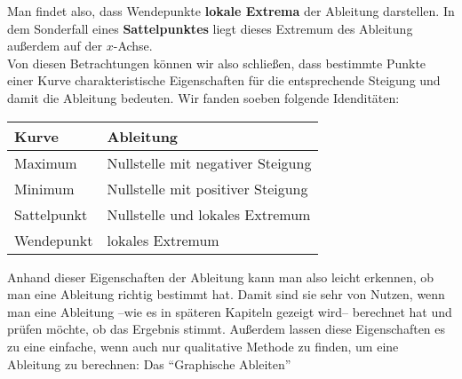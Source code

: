 \documentclass[../../main.tex]{subfiles}
\begin{document}
    Man findet also, dass Wendepunkte \textbf{lokale Extrema} der Ableitung darstellen. In dem Sonderfall eines \textbf{Sattelpunktes} liegt dieses Extremum des Ableitung außerdem auf der $x$-Achse.\\
    Von diesen Betrachtungen können wir also schließen, dass bestimmte Punkte einer Kurve charakteristische Eigenschaften für die entsprechende Steigung und damit die Ableitung bedeuten. Wir fanden soeben folgende Idenditäten:
    
    \begin{center}
        \begin{tabular}{ll}
            Kurve & Ableitung \\\hline
            Maximum & Nullstelle mit negativer Steigung\\
            Minimum & Nullstelle mit positiver Steigung\\
            Sattelpunkt & Nullstelle und lokales Extremum\\
            Wendepunkt & lokales Extremum
        \end{tabular}
    \end{center}
    Anhand dieser Eigenschaften der Ableitung kann man also leicht erkennen, ob man eine Ableitung richtig bestimmt hat. Damit sind sie sehr von Nutzen, wenn man eine Ableitung --wie es in späteren Kapiteln gezeigt wird-- berechnet hat und prüfen möchte, ob das Ergebnis stimmt. Außerdem lassen diese Eigenschaften es zu eine einfache, wenn auch nur qualitative Methode zu finden, um eine Ableitung zu berechnen: Das \enquote{Graphische Ableiten}
    
\end{document}

